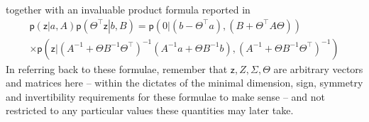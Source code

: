 \documentclass[preprint,12pt]{elsarticle}
\newcommand*{\M}[1]{\ensuremath{#1}\xspace}
\newcommand*{\tr}[1]{\M{#1}}
\newcommand*{\x}{\times}
\newcommand*{\rv}[1]{\mathsf{#1}}
\newcommand*{\prob}[3]{\M{\mathsf{p}\!\left(\left.{#1}\right\vert{#2,#3}\right)}}
\begin{document}
        \begin{equation} \label{eq:Notation:scaling}
        \end{equation}
        together with an invaluable product formula reported in \cite{Rasmussen2016}
        \begin{multline} \label{eq:Notation:product}
            \prob{\tr{\rv{z}}}{\tr{a}}{\tr{A}}\prob{\Theta^{\intercal}\tr{\rv{z}}}{\tr{b}}{\tr{B}}
            = \prob{\tr{0}}{(\tr{b}-\Theta^{\intercal}\tr{a})}{(\tr{B} + \Theta^{\intercal}\tr{A}\Theta)} \\
            \x \prob{\tr{\rv{z}}}
            {(\tr{A}^{-1}+\Theta\tr{B}^{-1}\Theta^{\intercal})^{-1}(\tr{A}^{-1}\tr{a}+\Theta\tr{B}^{-1}\tr{b})}
            {(\tr{A}^{-1}+\Theta\tr{B}^{-1}\Theta^{\intercal})^{-1}}
        \end{multline}
        In referring back to these formulae, remember that $\tr{\rv{z}}, \tr{Z}, \Sigma, \Theta$ are arbitrary vectors and matrices here -- within the dictates of the minimal dimension, sign, symmetry and invertibility requirements for these formulae to make sense -- and not restricted to any particular values these quantities may later take.
\end{document}
